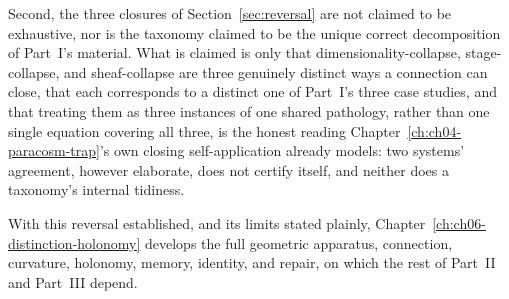 Second, the three closures of Section~\ref{sec:reversal} are not claimed to be exhaustive, nor is the taxonomy claimed to be the unique correct decomposition of Part~I's material. What is claimed is only that dimensionality-collapse, stage-collapse, and sheaf-collapse are three genuinely distinct ways a connection can close, that each corresponds to a distinct one of Part~I's three case studies, and that treating them as three instances of one shared pathology, rather than one single equation covering all three, is the honest reading Chapter~\ref{ch:ch04-paracosm-trap}'s own closing self-application already models: two systems' agreement, however elaborate, does not certify itself, and neither does a taxonomy's internal tidiness.

With this reversal established, and its limits stated plainly, Chapter~\ref{ch:ch06-distinction-holonomy} develops the full geometric apparatus, connection, curvature, holonomy, memory, identity, and repair, on which the rest of Part~II and Part~III depend.
